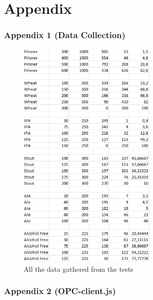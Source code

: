 \section{Appendix}

\subsubsection{Appendix 1 (Data Collection)}

\begin{center}
    \centering
    \begin{figure}[H]
        \includegraphics[width=0.6\textwidth]{img/datacollection.png}
        \caption{All the data gathered from the tests}
        \label{fig:datacollection}
    \end{figure}
  \end{center}

\newpage
\subsubsection{Appendix 2 (OPC-client.js)}

